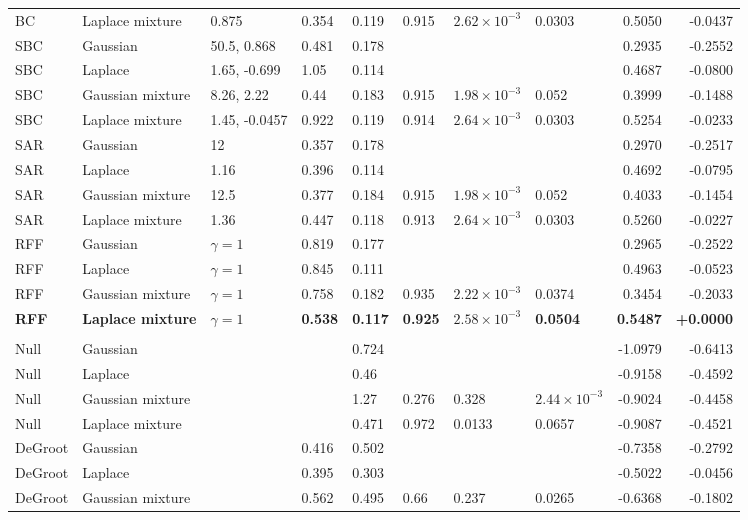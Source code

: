 \begin{longtable}{llllllllrr}
BC & Laplace mixture & 0.875 & 0.354 & 0.119 & 0.915 & $2.62\times10^{-3}$ & 0.0303 & 0.5050 & -0.0437 \\
SBC & Gaussian & 50.5, 0.868 & 0.481 & 0.178 &  &  &  & 0.2935 & -0.2552 \\
SBC & Laplace & 1.65, -0.699 & 1.05 & 0.114 &  &  &  & 0.4687 & -0.0800 \\
SBC & Gaussian mixture & 8.26, 2.22 & 0.44 & 0.183 & 0.915 & $1.98\times10^{-3}$ & 0.052 & 0.3999 & -0.1488 \\
SBC & Laplace mixture & 1.45, -0.0457 & 0.922 & 0.119 & 0.914 & $2.64\times10^{-3}$ & 0.0303 & 0.5254 & -0.0233 \\
SAR & Gaussian & 12 & 0.357 & 0.178 &  &  &  & 0.2970 & -0.2517 \\
SAR & Laplace & 1.16 & 0.396 & 0.114 &  &  &  & 0.4692 & -0.0795 \\
SAR & Gaussian mixture & 12.5 & 0.377 & 0.184 & 0.915 & $1.98\times10^{-3}$ & 0.052 & 0.4033 & -0.1454 \\
SAR & Laplace mixture & 1.36 & 0.447 & 0.118 & 0.913 & $2.64\times10^{-3}$ & 0.0303 & 0.5260 & -0.0227 \\
RFF & Gaussian & $\gamma=1$ & 0.819 & 0.177 &  &  &  & 0.2965 & -0.2522 \\
RFF & Laplace & $\gamma=1$ & 0.845 & 0.111 &  &  &  & 0.4963 & -0.0523 \\
RFF & Gaussian mixture & $\gamma=1$ & 0.758 & 0.182 & 0.935 & $2.22\times10^{-3}$ & 0.0374 & 0.3454 & -0.2033 \\
\textbf{RFF} & \textbf{Laplace mixture} & \textbf{$\gamma=1$} & \textbf{0.538} & \textbf{0.117} & \textbf{0.925} & \textbf{$2.58\times10^{-3}$} & \textbf{0.0504} & \textbf{0.5487} & \textbf{+0.0000} \\
\midrule
\multicolumn{10}{l}{\becker{}} \\
Null & Gaussian &  &  & 0.724 &  &  &  & -1.0979 & -0.6413 \\
Null & Laplace &  &  & 0.46 &  &  &  & -0.9158 & -0.4592 \\
Null & Gaussian mixture &  &  & 1.27 & 0.276 & 0.328 & $2.44\times10^{-3}$ & -0.9024 & -0.4458 \\
Null & Laplace mixture &  &  & 0.471 & 0.972 & 0.0133 & 0.0657 & -0.9087 & -0.4521 \\
DeGroot & Gaussian &  & 0.416 & 0.502 &  &  &  & -0.7358 & -0.2792 \\
DeGroot & Laplace &  & 0.395 & 0.303 &  &  &  & -0.5022 & -0.0456 \\
DeGroot & Gaussian mixture &  & 0.562 & 0.495 & 0.66 & 0.237 & 0.0265 & -0.6368 & -0.1802 \\

\end{longtable}
